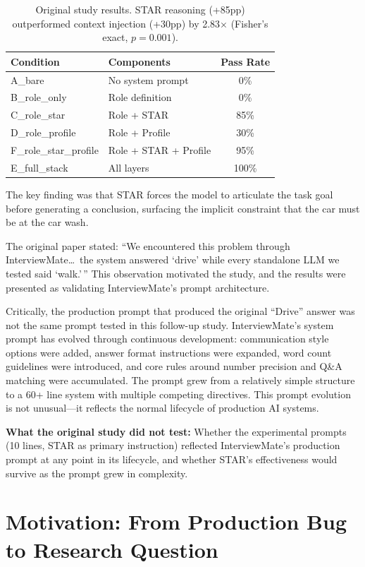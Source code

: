 \documentclass[11pt]{article}
\begin{document}
\begin{table}[H]
\centering
\begin{tabular}{llc}
\toprule
\textbf{Condition} & \textbf{Components} & \textbf{Pass Rate} \\
\midrule
A\_bare & No system prompt & 0\% \\
B\_role\_only & Role definition & 0\% \\
C\_role\_star & Role + STAR & 85\% \\
D\_role\_profile & Role + Profile & 30\% \\
F\_role\_star\_profile & Role + STAR + Profile & 95\% \\
E\_full\_stack & All layers & 100\% \\
\bottomrule
\end{tabular}
\caption{Original study results. STAR reasoning (+85pp) outperformed context injection (+30pp) by 2.83$\times$ (Fisher's exact, $p=0.001$).}
\label{tab:original}
\end{table}

The key finding was that STAR forces the model to articulate the task goal before generating a conclusion, surfacing the implicit constraint that the car must be at the car wash.

The original paper stated: ``We encountered this problem through InterviewMate\ldots\ the system answered `drive' while every standalone LLM we tested said `walk.'\,'' This observation motivated the study, and the results were presented as validating InterviewMate's prompt architecture.

Critically, the production prompt that produced the original ``Drive'' answer was not the same prompt tested in this follow-up study. InterviewMate's system prompt has evolved through continuous development: communication style options were added, answer format instructions were expanded, word count guidelines were introduced, and core rules around number precision and Q\&A matching were accumulated. The prompt grew from a relatively simple structure to a 60+ line system with multiple competing directives. This prompt evolution is not unusual---it reflects the normal lifecycle of production AI systems.

\textbf{What the original study did not test:} Whether the experimental prompts (10 lines, STAR as primary instruction) reflected InterviewMate's production prompt at any point in its lifecycle, and whether STAR's effectiveness would survive as the prompt grew in complexity.

\section{Motivation: From Production Bug to Research Question}
\end{document}
